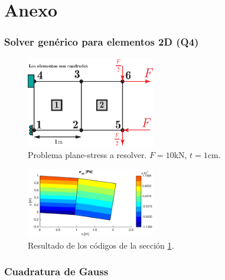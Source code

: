 
\part{Anexo}
\section{Solver genérico para elementos 2D (Q4)} \label{sec:q4codigo}

\begin{figure}[ht!]
	\centering
	\includegraphics[width=0.5\textwidth]{fig/q4domain.eps}
	\caption{Problema plane-stress a resolver. $F=10$kN, $t=1$cm.}
\end{figure}


\clearpage



\clearpage
\begin{figure}[ht!]
	\centering
	\includegraphics[width=0.5\textwidth]{code/q4domain.eps}
	\vspace{-1cm}
	\caption{Resultado de los códigos de la sección \ref{sec:q4codigo}. }
\end{figure}

\section{Cuadratura de Gauss}


